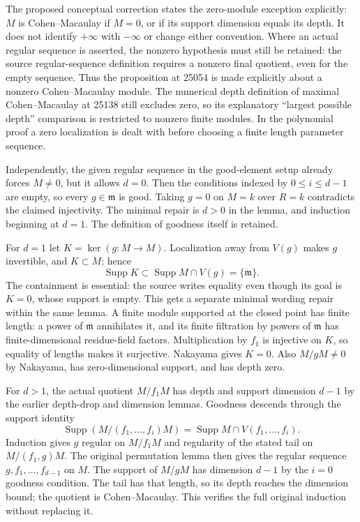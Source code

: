 The proposed conceptual correction states the zero-module exception explicitly: \(M\) is Cohen--Macaulay if \(M=0\), or if its support dimension equals its depth. It does not identify \(+\infty\) with \(-\infty\) or change either convention. Where an actual regular sequence is asserted, the nonzero hypothesis must still be retained: the source regular-sequence definition requires a nonzero final quotient, even for the empty sequence. Thus the proposition at 25054 is made explicitly about a nonzero Cohen--Macaulay module. The numerical depth definition of maximal Cohen--Macaulay at 25138 still excludes zero, so its explanatory ``largest possible depth'' comparison is restricted to nonzero finite modules. In the polynomial proof a zero localization is dealt with before choosing a finite length parameter sequence.

Independently, the given regular sequence in the good-element setup already forces \(M\ne0\), but it allows \(d=0\). Then the conditions indexed by \(0\le i\le d-1\) are empty, so every \(g\in\mathfrak m\) is good. Taking \(g=0\) on \(M=k\) over \(R=k\) contradicts the claimed injectivity. The minimal repair is \(d>0\) in the lemma, and induction beginning at \(d=1\). The definition of goodness itself is retained.

For \(d=1\) let \(K=\ker(g:M\to M)\). Localization away from \(V(g)\) makes \(g\) invertible, and \(K\subset M\); hence \[
 \operatorname{Supp}K\subset
 \operatorname{Supp}M\cap V(g)=\{\mathfrak m\}.
\] The containment is essential: the source writes equality even though its goal is \(K=0\), whose support is empty. This gets a separate minimal wording repair within the same lemma. A finite module supported at the closed point has finite length: a power of \(\mathfrak m\) annihilates it, and its finite filtration by powers of \(\mathfrak m\) has finite-dimensional residue-field factors. Multiplication by \(f_1\) is injective on \(K\), so equality of lengths makes it surjective. Nakayama gives \(K=0\). Also \(M/gM\ne0\) by Nakayama, has zero-dimensional support, and has depth zero.

For \(d>1\), the actual quotient \(M/f_1M\) has depth and support dimension \(d-1\) by the earlier depth-drop and dimension lemmas. Goodness descends through the support identity \[
 \operatorname{Supp}(M/(f_1,\ldots,f_i)M)
 =\operatorname{Supp}M\cap V(f_1,\ldots,f_i).
\] Induction gives \(g\) regular on \(M/f_1M\) and regularity of the stated tail on \(M/(f_1,g)M\). The original permutation lemma then gives the regular sequence \(g,f_1,\ldots,f_{d-1}\) on \(M\). The support of \(M/gM\) has dimension \(d-1\) by the \(i=0\) goodness condition. The tail has that length, so its depth reaches the dimension bound; the quotient is Cohen--Macaulay. This verifies the full original induction without replacing it.


